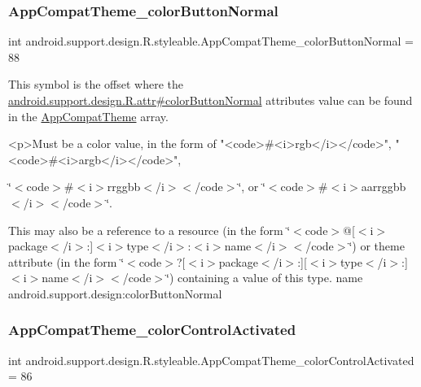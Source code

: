 \subsubsection{\texorpdfstring{App\+Compat\+Theme\+\_\+color\+Button\+Normal}{AppCompatTheme\_colorButtonNormal}}
{\footnotesize\ttfamily int android.\+support.\+design.\+R.\+styleable.\+App\+Compat\+Theme\+\_\+color\+Button\+Normal = 88\hspace{0.3cm}{\ttfamily [static]}}

This symbol is the offset where the \hyperlink{classandroid_1_1support_1_1design_1_1R_1_1attr_a9aab1b1f5f5e55e485569f56f4a23d6c}{android.\+support.\+design.\+R.\+attr\#color\+Button\+Normal} attribute\textquotesingle{}s value can be found in the \hyperlink{classandroid_1_1support_1_1design_1_1R_1_1styleable_afb351dc8de20cbd4c89abe360373010c}{App\+Compat\+Theme} array.

\begin{DoxyVerb}      <p>Must be a color value, in the form of "<code>#<i>rgb</i></code>", "<code>#<i>argb</i></code>",
\end{DoxyVerb}
 \char`\"{}$<$code$>$\#$<$i$>$rrggbb$<$/i$>$$<$/code$>$\char`\"{}, or \char`\"{}$<$code$>$\#$<$i$>$aarrggbb$<$/i$>$$<$/code$>$\char`\"{}. 

This may also be a reference to a resource (in the form \char`\"{}$<$code$>$@\mbox{[}$<$i$>$package$<$/i$>$\+:\mbox{]}$<$i$>$type$<$/i$>$\+:$<$i$>$name$<$/i$>$$<$/code$>$\char`\"{}) or theme attribute (in the form \char`\"{}$<$code$>$?\mbox{[}$<$i$>$package$<$/i$>$\+:\mbox{]}\mbox{[}$<$i$>$type$<$/i$>$\+:\mbox{]}$<$i$>$name$<$/i$>$$<$/code$>$\char`\"{}) containing a value of this type.  name android.\+support.\+design\+:color\+Button\+Normal \mbox{\label{classandroid_1_1support_1_1design_1_1R_1_1styleable_af7ed613c3f87592a89ab7e391abb7b7d}} 
\subsubsection{\texorpdfstring{App\+Compat\+Theme\+\_\+color\+Control\+Activated}{AppCompatTheme\_colorControlActivated}}
{\footnotesize\ttfamily int android.\+support.\+design.\+R.\+styleable.\+App\+Compat\+Theme\+\_\+color\+Control\+Activated = 86\hspace{0.3cm}{\ttfamily [static]}}

